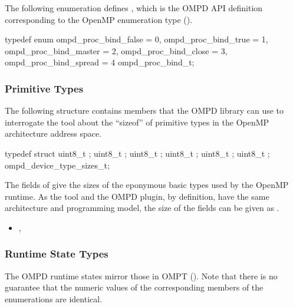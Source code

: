 The following enumeration defines , which is the OMPD
API definition corresponding to the OpenMP enumeration type
 ().

\format

\begin{ccppspecific}
\begin{ompSyntax}
typedef enum {
  ompd_proc_bind_false = 0,
  ompd_proc_bind_true = 1,
  ompd_proc_bind_master = 2,
  ompd_proc_bind_close = 3,
  ompd_proc_bind_spread = 4
} ompd_proc_bind_t;
\end{ompSyntax}
\end{ccppspecific}


\subsubsection{Primitive Types}
\label{ompd:ompd_device_type_sizes_t}
The following structure contains members that the OMPD library can use
to interrogate the tool about the ``sizeof'' of primitive types in the OpenMP architecture 
address space.

\format

\begin{ccppspecific}
\begin{ompSyntax}
typedef struct {
  uint8_t ;
  uint8_t ;
  uint8_t ;
  uint8_t ;
  uint8_t ;
  uint8_t ;
} ompd_device_type_sizes_t;
\end{ompSyntax}
\end{ccppspecific}


\descr
The fields of  give the sizes of
the eponymous basic types used by the OpenMP runtime.
As the tool and the OMPD plugin, by definition, have the same
architecture and programming model, the size of the fields can be given
as .

\crossreferences
\begin{itemize}
	\item
	, 
\end{itemize}

\subsubsection{Runtime State Types}

The OMPD runtime states mirror those in OMPT (). Note that there is no guarantee that 
the numeric values of the corresponding members of the enumerations are identical.

